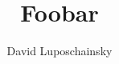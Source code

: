 

\title{Foobar}
\author{David Luposchainsky}

\newcommand\SEnv{\ensuremath{S_\text{env}}}
\newcommand\STot{\ensuremath{S_\text{tot}}}
\newcommand\SSys{\ensuremath{S_\text{sys}}}

\newcommand\init{\text{init}}





% 
% 
% 
% 
% 

% 
% 
% 
% 
% 
% 

